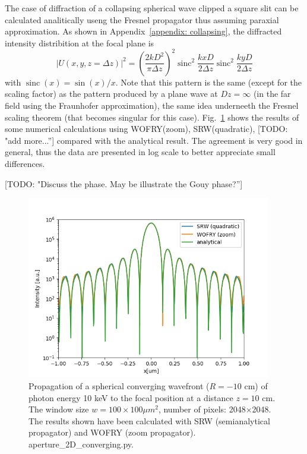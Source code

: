 \documentclass{iucr}              %
\newcommand{\todo}[1]{{\color{red}[TODO: "#1'']}}
\newcommand{\inblue}[1]{{\color{blue}#1}}
\newcommand{\inred}[1]{{\color{red}#1}}
\DeclareMathOperator{\sinc}{sinc}
\begin{document}
The case of diffraction of a collapsing spherical wave clipped a square slit can be calculated analitically useng the Fresnel propagator thus assuming paraxial approximation. As shown in Appendix~\ref{appendix: collapsing}, the diffracted intensity distribition at the focal plane is
\begin{equation}
    |U(x,y,z=\Delta z)|^2 = \left( \frac{2 k D^2}{\pi \Delta z}\right)^2 \sinc^2\frac{k x D}{2 \Delta z} \sinc^2\frac{k y D}{2 \Delta z}
\end{equation}
with $\sinc(x)=\sin(x)/x$. Note that this pattern is the same (except for the scaling factor) as the pattern produced by a plane wave at $Dz=\infty$ (in the far field using the Fraunhofer approximation), the same idea underneeth the Fresnel scaling theorem (that becomes singular for this case). Fig.~\ref{fig: slit 2D converging} shows the results of some numerical calculations using WOFRY(zoom), SRW(quadratic), \todo{add more...} compared with the analytical result. The agreement is very good in general, thus the data are presented in log scale to better appreciate small differences.  

\todo{Discuss the phase. May be illustrate the Gouy phase?}

\begin{figure}
\label{fig: slit 2D converging}
\caption{Propagation of a spherical converging wavefront ($R=-10$ cm) of photon energy 10 keV to the focal position at a distance $z = 10$ cm. The window size $w=100 \times 100 \mu m^2$, number of pixels: 2048$\times$2048. The results shown have been calculated with SRW (semianalytical propagator) and WOFRY (zoom propagator). \inblue{aperture\_2D\_converging.py}.
}
\includegraphics[width=0.95\textwidth]{aperture_2D_converging.png}
\end{figure}
\end{document}
